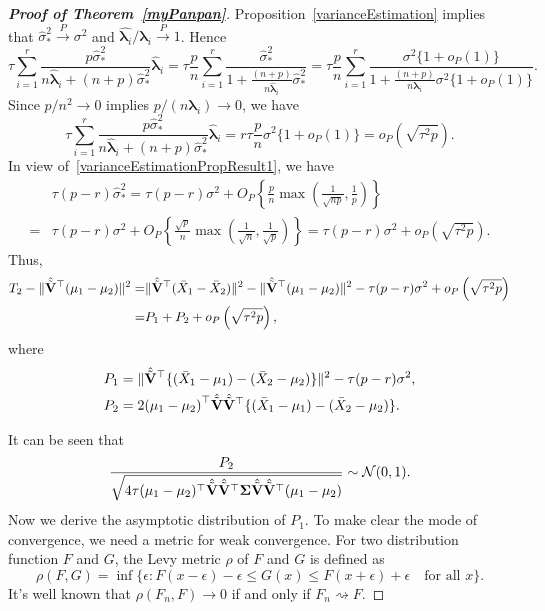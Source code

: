 \documentclass[times,sort&compress,3p]{elsarticle}
\newcommand{\bfsym}[1]{\ensuremath{\boldsymbol{#1}}}
\def\blambda {\bfsym {\lambda}}        \def\bLambda {\bfsym {\Lambda}}
\theoremstyle{plain}
\theoremstyle{definition}
\theoremstyle{remark}
\begin{document}
\begin{appendices}
\begin{proof}[\textbf{Proof of Theorem~\ref{myPanpan}}]
    Proposition~\ref{varianceEstimation} implies that $\hat{\sigma}_{*}^2\xrightarrow{P} \sigma^2$ and $\hat{\blambda_i}/\blambda_i\xrightarrow{P} 1$.
    Hence
    $$
 \tau\sum_{i=1}^r \frac{p\hat{\sigma}_*^2}{n\hat{\blambda}_i+(n+p)\hat{\sigma}_*^2}\hat{\blambda}_i
        =
        \tau\frac{p}{n}\sum_{i=1}^r \frac{\hat{\sigma}_*^2}{1+\frac{(n+p)}{n\hat{\blambda}_i}\hat{\sigma}_*^2}
        =
        \tau\frac{p}{n}\sum_{i=1}^r \frac{\sigma^2\{1+o_P(1)\} }{1+\frac{(n+p)}{n\blambda_i}\sigma^2 \{1+o_P(1)\}}.
    $$
    Since $p/n^2\to 0$ implies $p/(n\blambda_i)\to 0$, we have
    $$
 \tau\sum_{i=1}^r \frac{p\hat{\sigma}_*^2}{n\hat{\blambda}_i+(n+p)\hat{\sigma}_*^2}\hat{\blambda}_i
 =r\tau \frac{p}{n} \sigma^2\{1+o_P(1)\}=o_P\left(\sqrt{\tau^2 p}\right).
    $$
    In view of~\eqref{varianceEstimationPropResult1}, we have
    \begin{align*}
        &\tau(p-r)\hat{\sigma}_*^2 =
    \tau(p-r)\sigma^2 + O_P\left\{\frac{p}{n}\max\left(\frac{1}{\sqrt{np}},\frac{1}{p}\right)\right\}\\
        =&
        \tau(p-r)\sigma^2 + O_P\left\{\frac{\sqrt{p}}{n}\max\left(\frac{1}{\sqrt{n}},\frac{1}{\sqrt{p}}\right)\right\}
        =\tau(p-r)\sigma^2 + o_P\left(\sqrt{\tau^2 p}\right).
    \end{align*}
Thus,
\begin{align*}
    T_2-\|\hat{\tilde{\mathbf{V}}}^\top (\mu_1-\mu_2)\|^2
    =&
    \|\hat{\tilde{\mathbf{V}}}^\top (\bar{X}_1-\bar{X}_2)\|^2-\|\hat{\tilde{\mathbf{V}}}^\top (\mu_1-\mu_2)\|^2
-\tau (p-r)\sigma^2
    +o_P\left(\sqrt{\tau^2 p}\right)\\
    =&P_1+P_2
    +o_P\left(\sqrt{\tau^2 p}\right),
\end{align*}
where
\begin{align*}
    P_1&=\|\hat{\tilde{\mathbf{V}}}^\top \{(\bar{X}_1-\mu_1)-(\bar{X}_2-\mu_2)\}\|^2- \tau (p-r)\sigma^2,\\
    P_2&=2{(\mu_1-\mu_2)}^\top  \hat{\tilde{\mathbf{V}}}\hat{\tilde{\mathbf{V}}}^\top \{(\bar{X}_1-\mu_1)-(\bar{X}_2-\mu_2)\}.
\end{align*}


   It can be seen that
   $$
   \frac{P_2}{\sqrt{4\tau (\mu_1-\mu_2)^\top  \hat{\tilde{\BV}}\hat{\tilde{\BV}}^\top  \bSigma\hat{\tilde{\BV}}\hat{\tilde{\BV}}^\top  (\mu_1-\mu_2)}} \sim \mathcal{N}(0,1).
   $$
    Now we derive the asymptotic distribution of $P_1$.
    To make clear the mode of convergence, we need a metric for weak convergence. For two distribution function $F$ and $G$, the Levy metric $\rho$ of $F$ and $G$ is defined as
    $$
   \rho(F,G) =\inf\{\epsilon:F(x-\epsilon)-\epsilon\leq G(x)\leq F(x+\epsilon)+\epsilon\quad \textrm{for all $x$}\}.
    $$
    It's well known that $\rho(F_n,F)\to 0$ if and only if $F_n\rightsquigarrow F$.



\end{proof}
\end{appendices}
\end{document}
